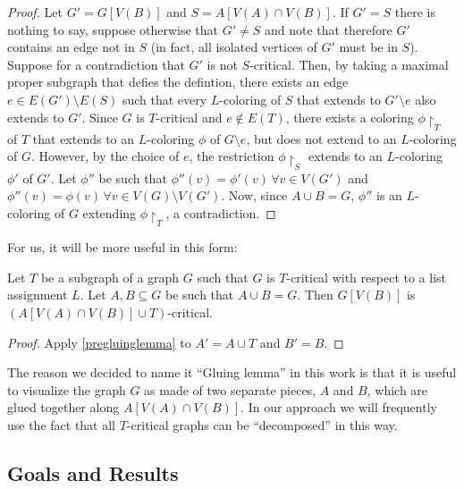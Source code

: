 \begin{proof} 
Let $G' = G[V(B)]$ and $S = A[V(A) \cap V(B)]$. If $G' = S$ there is nothing to say, suppose otherwise that $G' \neq S$ and note that therefore $G'$ contains an edge not in $S$ (in fact, all isolated vertices of $G'$ must be in $S$). Suppose for a contradiction that $G'$ is not $S$-critical. Then, by taking a maximal proper subgraph that defies the defintion, there exists an edge $e \in E(G') \setminus E(S)$ such that every $L$-coloring of $S$ that extends to $G' \setminus e$ also extends to $G'$. Since $G$ is $T$-critical and $e \not\in E(T)$, there exists a coloring $\phi\restriction_T$ of $T$ that extends to an $L$-coloring $\phi$ of $G \setminus e$, but does not extend to an $L$-coloring of $G$. However, by the choice of $e$, the restriction $\phi\restriction_S$ extends to an $L$-coloring $\phi'$ of $G'$. Let $\phi''$ be such that $\phi''(v) = \phi'(v) \, \forall v \in V(G')$ and $\phi''(v) = \phi(v) \, \forall v \in V(G) \setminus V(G')$. Now, since $A \cup B = G$, $\phi''$ is an $L$-coloring of $G$ extending $\phi\restriction_T$, a contradiction.
\end{proof}

For us, it will be more useful in this form:

\begin{lemma}
\label{gluinglemma}
Let $T$ be a subgraph of a graph $G$ such that $G$ is $T$-critical with respect to a list assignment $L$. Let $A, B \subseteq G$ be such that $A \cup B = G$. Then $G[V(B)]$ is $(A[V(A) \cap V(B)] \cup T)$-critical.
\end{lemma}

\begin{proof} 
Apply \ref{pregluinglemma} to $A' = A \cup T$ and $B' = B$. 
\end{proof}


The reason we decided to name it ``Gluing lemma'' in this work is that it is useful to visualize the graph $G$ as made of two separate pieces, $A$ and $B$, which are glued together along $A[V(A) \cap V(B)]$. In our approach we will frequently use the fact that all $T$-critical graphs can be ``decomposed'' in this way. 


\subsection{Goals and Results}

